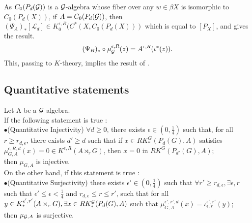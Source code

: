 As $C_0(P_d(\mathcal G))$ is a $\mathcal G$-algebra whose fiber over any $w\in\beta X$ is isomorphic to $C_0(P_d(X))$, if $A=C_0(P_d(\mathcal G))$, then $(\Psi_A)_*[\mathcal L_d]\in K^{\epsilon , R}_0(C^*(X,C_0(P_d(X)))$ which is equal to $[P_X]$, and gives the result.
\[(\Psi_B)_*\circ\mu^{\epsilon,R}_\mathcal G (z) = A^{\epsilon,R}(\iota^*(z)).\]
This, passing to $K$-theory, implies the result of \cite{SkTuYu}.\\


\subsection{Quantitative statements}

\begin{prop} 
Let A be a $\mathcal G$-algebra.\\
If the following statement is true :\\

$\bullet$(Quantitative Injectivity) $\forall d\geq 0$, there exists $\epsilon\in (0,\frac{1}{4})$ such that, for all $r\geq r_{d,\epsilon}$, there exists $d'\geq d$ such that if $x\in RK_*^G(P_d(G),A)$ satisfies $\mu_{G,A}^{\epsilon,R,d}(x)=0\in K^{\epsilon,R}(A\rtimes_r G)$, then $x=0$ in $RK^G(P_{d'}(G),A)$;\\

then $\mu_{G,A}$ is injective.\\

On the other hand, if this statement is true : \\

$\bullet$(Quantitative Surjectivity) there exists $\epsilon'\in (0,\frac{1}{4})$ such that $\forall r'\geq r_{d,\epsilon},\exists \epsilon,r$ such that $\epsilon'\leq \epsilon<\frac{1}{4}$ and $r_{d,\epsilon}\leq r\leq r'$, such that for all $y\in K_*^{\epsilon',r'}(A\rtimes_r G),\exists x \in RK_*^\mathcal G(P_d(G),A)$ such that $\mu_{G,A}^{\epsilon',r',d}(x)=\iota_{\epsilon,r}^{\epsilon',r'}(y)$;\\

then $\mu_{\mathcal G,A}$ is surjective.
\end{prop}

